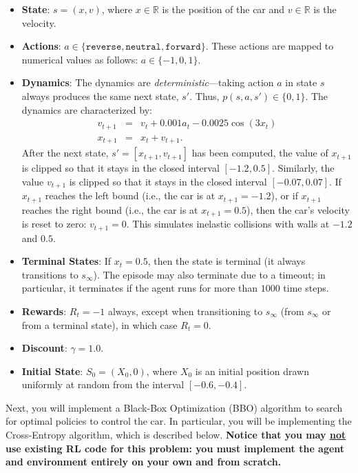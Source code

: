 \documentclass{article}
\begin{document}
\begin{itemize}
    \item \textbf{State}: $s=(x,v)$, where $x \in \mathbb R$ is the position of the car and $v \in \mathbb R$ is the velocity.
    \item \textbf{Actions}: $a \in \{\texttt{reverse}, \texttt{neutral}, \texttt{forward}\}$. These actions are mapped to numerical values as follows: $a \in \{-1,0,1\}$. 
    \item \textbf{Dynamics}: The dynamics are \emph{deterministic}---taking action $a$ in state $s$ always produces the same next state, $s'$. Thus, $p(s,a,s') \in \{0,1\}$. The dynamics are characterized by:
    \begin{eqnarray*}
    v_{t+1}&=&v_t + 0.001a_t - 0.0025\cos(3 x_t)\\
    x_{t+1}&=&x_t + v_{t+1}.
        \end{eqnarray*}
    After the next state, $s' = [x_{t+1}, v_{t+1}]$ has been computed, the value of $x_{t+1}$ is clipped so that it stays in the closed interval $[-1.2, 0.5]$. Similarly, the value $v_{t+1}$ is clipped so that it stays in the closed interval $[-0.07, 0.07]$. If $x_{t+1}$ reaches the left bound (i.e., the car is at $x_{t+1}=-1.2$), or if $x_{t+1}$ reaches the right bound (i.e., the car is at $x_{t+1}=0.5$), then the car's velocity is reset to zero: $v_{t+1}=0$. This simulates inelastic collisions with walls at $-1.2$ and $0.5$. 
    \item \textbf{Terminal States}: If $x_t=0.5$, then the state is terminal (it always transitions to $s_\infty$). The episode may also terminate due to a timeout; in particular, it terminates if the agent runs for more than $1000$ time steps.
    \item \textbf{Rewards}: $R_t=-1$ always, except when transitioning to $s_\infty$ (from $s_\infty$ or from a terminal state), in which case $R_t=0$. 
    \item \textbf{Discount}: $\gamma=1.0$.
    \item \textbf{Initial State}: $S_0=(X_0,0)$, where $X_0$ is an initial position drawn uniformly at random from the interval $[-0.6, -0.4]$. 
\end{itemize}

Next, you will implement a Black-Box Optimization (BBO) algorithm to search for optimal policies to control the car. In particular, you will be implementing the Cross-Entropy algorithm, which is described below. 
%
\textbf{Notice that you may \ul{not} use existing RL code for this problem: you must implement the agent and environment entirely on your own and from scratch.} 
%
\end{document}
